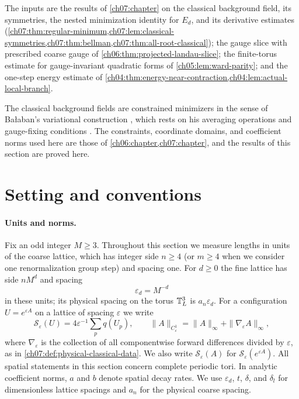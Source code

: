 The inputs are the results of \cref{ch07:chapter} on the classical background field, its symmetries, the nested minimization identity for $E_d$, and its derivative estimates (\cref{ch07:thm:regular-minimum,ch07:lem:classical-symmetries,ch07:thm:bellman,ch07:thm:all-root-classical}); the gauge slice with prescribed coarse gauge of \cref{ch06:thm:projected-landau-slice}; the finite-torus estimate for gauge-invariant quadratic forms of \cref{ch05:lem:ward-parity}; and the one-step energy estimate of \cref{ch04:thm:energy-near-contraction,ch04:lem:actual-local-branch}.

The classical background fields are constrained minimizers in the sense of Bałaban's variational construction \cite[Theorem~1, p.~279]{Balaban1985Variational}, which rests on his averaging operations and gauge-fixing conditions \cite{Balaban1985Averaging,Balaban1985Regular}. The constraints, coordinate domains, and coefficient norms used here are those of \cref{ch06:chapter,ch07:chapter}, and the results of this section are proved here.

\section{Setting and conventions}\label{ch08:sec:setting}

\paragraph{Units and norms.}
Fix an odd integer $M\ge3$. Throughout this section we measure lengths in units of the coarse lattice, which has integer side $n\ge4$ (or $m\ge4$ when we consider one renormalization group step) and spacing one. For $d\ge0$ the fine lattice has side $nM^d$ and spacing
\[
 \varepsilon_d=M^{-d}
\]
in these units; its physical spacing on the torus $\mathbb T_L^3$ is $a_n\varepsilon_d$. For a configuration $U=e^{\varepsilon A}$ on a lattice of spacing $\varepsilon$ we write
\[
 \mathscr S_\varepsilon(U)=4\varepsilon^{-1}\sum_pq(U_p),
 \qquad
 \|A\|_{C^1_\varepsilon}=\|A\|_\infty+\|\nabla_\varepsilon A\|_\infty,
\]
where $\nabla_\varepsilon$ is the collection of all componentwise forward differences divided by $\varepsilon$, as in \cref{ch07:def:physical-classical-data}. We also write $\mathscr S_\varepsilon(A)$ for $\mathscr S_\varepsilon(e^{\varepsilon A})$. All spatial statements in this section concern complete periodic tori. In analytic coefficient norms, $a$ and $b$ denote spatial decay rates. We use $\varepsilon_d$, $t$, $\delta$, and $\delta_l$ for dimensionless lattice spacings and $a_n$ for the physical coarse spacing.


